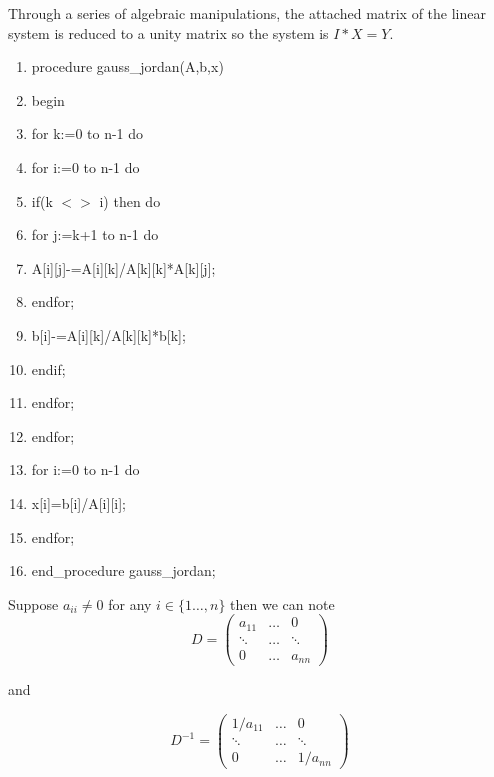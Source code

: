 \documentclass[times,10pt,twocolumn]{article}
\begin{document}

Through a series of algebraic manipulations, the attached matrix
of the linear system is reduced to a unity matrix so the system is
$I*X=Y$.

\begin{enumerate}
\item procedure gauss\_jordan(A,b,x)
\item begin
\item for k:=0 to n-1 do
\item for i:=0 to n-1 do
\item if(k $< >$ i) then do
\item for j:=k+1 to n-1 do
\item A[i][j]-=A[i][k]/A[k][k]*A[k][j];
\item endfor;
\item b[i]-=A[i][k]/A[k][k]*b[k];
\item endif;
\item endfor;
\item endfor;
\item for i:=0 to n-1 do
\item x[i]=b[i]/A[i][i];
\item endfor;
\item end\_procedure gauss\_jordan;
\end{enumerate}


 Suppose $a_{ii}\not=0$ for any $i\in\{1\ldots ,n\}$ then we can note
\begin{displaymath}
 D=\left(\begin{array}{ccc}
a_{11} & \ldots &0 \\
\ddots &\ldots &\ddots \\
 0 & \ldots & a_{nn}
\end{array}\right)
\end{displaymath}

and

\begin{displaymath} D^{-1}=\left(\begin{array}{ccc}
 1/a_{11} &\ldots &0\\
\ddots & \ldots &\ddots \\
0 & \ldots & 1/a_{nn}
\end{array}\right)
\end{displaymath}
\end{document}
